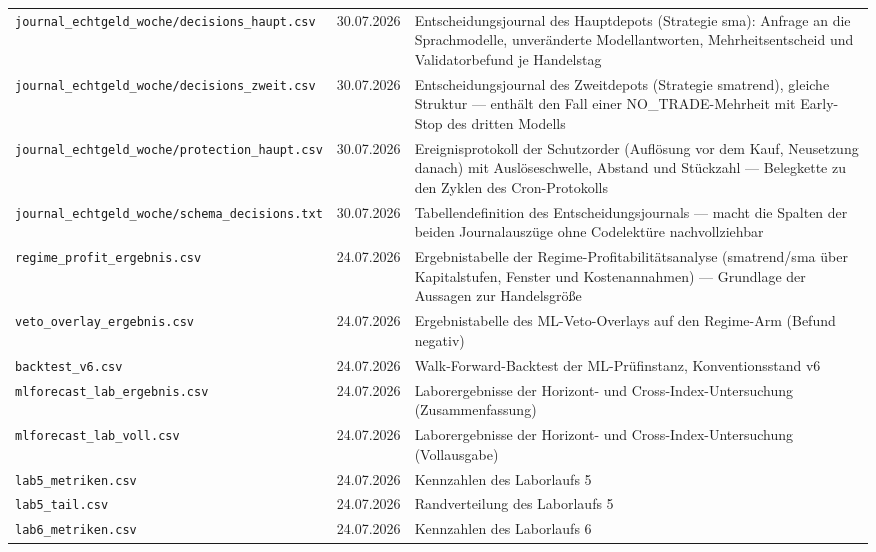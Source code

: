 \begin{longtable}{@{}p{}p{}p{}@{}}
  \texttt{journal\_\allowbreak echtgeld\_\allowbreak woche/\allowbreak decisions\_\allowbreak haupt.csv} & 30.07.2026 & Entscheidungsjournal des Hauptdepots (Strategie sma): Anfrage an die Sprachmodelle, unveränderte Modellantworten, Mehrheitsentscheid und Validatorbefund je Handelstag \\
  \texttt{journal\_\allowbreak echtgeld\_\allowbreak woche/\allowbreak decisions\_\allowbreak zweit.csv} & 30.07.2026 & Entscheidungsjournal des Zweitdepots (Strategie smatrend), gleiche Struktur — enthält den Fall einer NO\_TRADE-Mehrheit mit Early-Stop des dritten Modells \\
  \texttt{journal\_\allowbreak echtgeld\_\allowbreak woche/\allowbreak protection\_\allowbreak haupt.csv} & 30.07.2026 & Ereignisprotokoll der Schutzorder (Auflösung vor dem Kauf, Neusetzung danach) mit Auslöseschwelle, Abstand und Stückzahl — Belegkette zu den Zyklen des Cron-Protokolls \\
  \texttt{journal\_\allowbreak echtgeld\_\allowbreak woche/\allowbreak schema\_\allowbreak decisions.txt} & 30.07.2026 & Tabellendefinition des Entscheidungsjournals — macht die Spalten der beiden Journalauszüge ohne Codelektüre nachvollziehbar \\
  \texttt{regime\_\allowbreak profit\_\allowbreak ergebnis.csv} & 24.07.2026 & Ergebnistabelle der Regime-Profitabilitätsanalyse (smatrend/sma über Kapitalstufen, Fenster und Kostenannahmen) — Grundlage der Aussagen zur Handelsgröße \\
  \texttt{veto\_\allowbreak overlay\_\allowbreak ergebnis.csv} & 24.07.2026 & Ergebnistabelle des ML-Veto-Overlays auf den Regime-Arm (Befund negativ) \\
  \texttt{backtest\_\allowbreak v6.csv} & 24.07.2026 & Walk-Forward-Backtest der ML-Prüfinstanz, Konventionsstand v6 \\
  \texttt{mlforecast\_\allowbreak lab\_\allowbreak ergebnis.csv} & 24.07.2026 & Laborergebnisse der Horizont- und Cross-Index-Untersuchung (Zusammenfassung) \\
  \texttt{mlforecast\_\allowbreak lab\_\allowbreak voll.csv} & 24.07.2026 & Laborergebnisse der Horizont- und Cross-Index-Untersuchung (Vollausgabe) \\
  \texttt{lab5\_\allowbreak metriken.csv} & 24.07.2026 & Kennzahlen des Laborlaufs 5 \\
  \texttt{lab5\_\allowbreak tail.csv} & 24.07.2026 & Randverteilung des Laborlaufs 5 \\
  \texttt{lab6\_\allowbreak metriken.csv} & 24.07.2026 & Kennzahlen des Laborlaufs 6 \\

\end{longtable}
